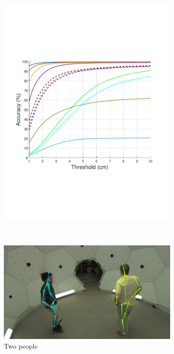\begin{figure}[t]
\begin{subfigure}{0.245\textwidth}
		\includegraphics[trim=40 180 60 		170,clip,width=\textwidth]{figures/0822_quant_noLegend/PCK-Threshold-seven-people.pdf}
	\end{subfigure}\\
		\begin{subfigure}{0.245\textwidth}
			
			\includegraphics[width=\textwidth]{figures/0807_quant_noLegend/two}
	\caption{Two people}		
		\end{subfigure}
		\begin{subfigure}{0.245\textwidth}
			

\end{subfigure}
\end{figure}
